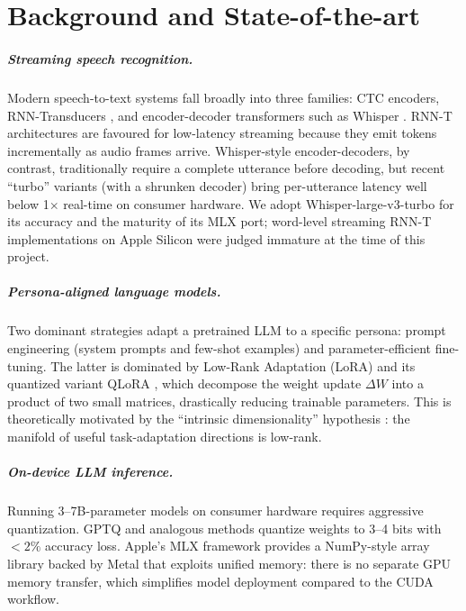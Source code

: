 \documentclass{ecsproject}
\begin{document}
\chapter{Background and State-of-the-art}
\label{Chapter:Background}

\paragraph{Streaming speech recognition.}
Modern speech-to-text systems fall broadly into three families: CTC
encoders, RNN-Transducers \citep{graves2012sequence}, and
encoder-decoder transformers such as Whisper \citep{radford2022whisper}.
RNN-T architectures are favoured for low-latency streaming because
they emit tokens incrementally as audio frames arrive. Whisper-style
encoder-decoders, by contrast, traditionally require a complete
utterance before decoding, but recent ``turbo'' variants (with a
shrunken decoder) bring per-utterance latency well below 1$\times$
real-time on consumer hardware. We adopt Whisper-large-v3-turbo for
its accuracy and the maturity of its MLX port; word-level streaming
RNN-T implementations on Apple Silicon were judged immature at the
time of this project.

\paragraph{Persona-aligned language models.}
Two dominant strategies adapt a pretrained LLM to a specific persona:
prompt engineering (system prompts and few-shot examples) and
parameter-efficient fine-tuning. The latter is dominated by Low-Rank
Adaptation (LoRA) \citep{hu2021lora} and its quantized variant QLoRA
\citep{dettmers2023qlora}, which decompose the weight update
$\Delta W$ into a product of two small matrices, drastically reducing
trainable parameters. This is theoretically motivated by the
``intrinsic dimensionality'' hypothesis \citep{aghajanyan2020intrinsic}:
the manifold of useful task-adaptation directions is low-rank.

\paragraph{On-device LLM inference.}
Running 3--7B-parameter models on consumer hardware requires aggressive
quantization. GPTQ \citep{frantar2022gptq} and analogous methods
quantize weights to 3--4 bits with $<\!2\%$ accuracy loss. Apple's
MLX framework \citep{mlx2023} provides a NumPy-style array library
backed by Metal that exploits unified memory: there is no separate
GPU memory transfer, which simplifies model deployment compared to
the CUDA workflow.
\end{document}
